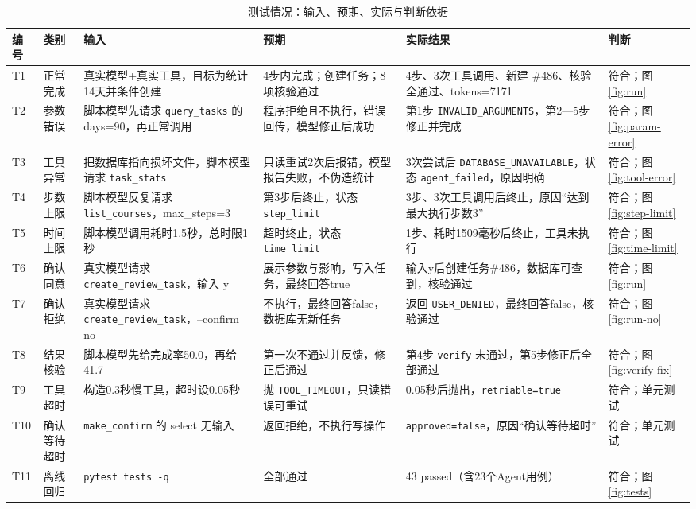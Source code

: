 \documentclass[UTF8,12pt,a4paper]{ctexart}
\begin{document}
\begin{table}[H]
\centering
\caption{测试情况：输入、预期、实际与判断依据}
\label{tab:tests}
\scriptsize
\begin{tabularx}{\textwidth}{L{0.5cm}L{1.7cm}L{3.5cm}L{3.3cm}L{3.1cm}L{1.4cm}}
\toprule
编号 & 类别 & 输入 & 预期 & 实际结果 & 判断 \\
\midrule
T1 & 正常完成 & 真实模型+真实工具，目标为统计14天并条件创建 & 4步内完成；创建任务；8项核验通过 & 4步、3次工具调用、新建 \#486、核验全通过、tokens=7171 & 符合；图\ref{fig:run} \\
T2 & 参数错误 & 脚本模型先请求 \texttt{query\_tasks} 的 days=90，再正常调用 & 程序拒绝且不执行，错误回传，模型修正后成功 & 第1步 \texttt{INVALID\_ARGUMENTS}，第2—5步修正并完成 & 符合；图\ref{fig:param-error} \\
T3 & 工具异常 & 把数据库指向损坏文件，脚本模型请求 \texttt{task\_stats} & 只读重试2次后报错，模型报告失败，不伪造统计 & 3次尝试后 \texttt{DATABASE\_UNAVAILABLE}，状态 \texttt{agent\_failed}，原因明确 & 符合；图\ref{fig:tool-error} \\
T4 & 步数上限 & 脚本模型反复请求 \texttt{list\_courses}，max\_steps=3 & 第3步后终止，状态 \texttt{step\_limit} & 3步、3次工具调用后终止，原因“达到最大执行步数3” & 符合；图\ref{fig:step-limit} \\
T5 & 时间上限 & 脚本模型调用耗时1.5秒，总时限1秒 & 超时终止，状态 \texttt{time\_limit} & 1步、耗时1509毫秒后终止，工具未执行 & 符合；图\ref{fig:time-limit} \\
T6 & 确认同意 & 真实模型请求 \texttt{create\_review\_task}，输入 y & 展示参数与影响，写入任务，最终回答true & 输入y后创建任务\#486，数据库可查到，核验通过 & 符合；图\ref{fig:run} \\
T7 & 确认拒绝 & 真实模型请求 \texttt{create\_review\_task}，--confirm no & 不执行，最终回答false，数据库无新任务 & 返回 \texttt{USER\_DENIED}，最终回答false，核验通过 & 符合；图\ref{fig:run-no} \\
T8 & 结果核验 & 脚本模型先给完成率50.0，再给41.7 & 第一次不通过并反馈，修正后通过 & 第4步 \texttt{verify} 未通过，第5步修正后全部通过 & 符合；图\ref{fig:verify-fix} \\
T9 & 工具超时 & 构造0.3秒慢工具，超时设0.05秒 & 抛 \texttt{TOOL\_TIMEOUT}，只读错误可重试 & 0.05秒后抛出，\texttt{retriable=true} & 符合；单元测试 \\
T10 & 确认等待超时 & \texttt{make\_confirm} 的 select 无输入 & 返回拒绝，不执行写操作 & \texttt{approved=false}，原因“确认等待超时” & 符合；单元测试 \\
T11 & 离线回归 & \texttt{pytest tests -q} & 全部通过 & 43 passed（含23个Agent用例） & 符合；图\ref{fig:tests} \\
\bottomrule
\end{tabularx}
\end{table}
\end{document}
